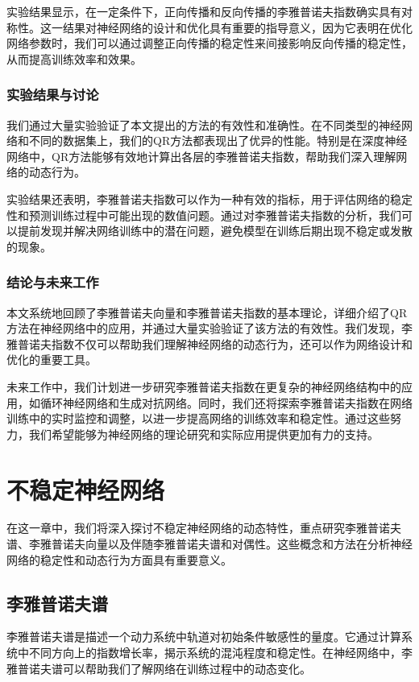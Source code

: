 \documentclass[12pt,a4paper]{amsart}
\begin{document}
实验结果显示，在一定条件下，正向传播和反向传播的李雅普诺夫指数确实具有对称性。这一结果对神经网络的设计和优化具有重要的指导意义，因为它表明在优化网络参数时，我们可以通过调整正向传播的稳定性来间接影响反向传播的稳定性，从而提高训练效率和效果。

\subsubsection{实验结果与讨论}

我们通过大量实验验证了本文提出的方法的有效性和准确性。在不同类型的神经网络和不同的数据集上，我们的QR方法都表现出了优异的性能。特别是在深度神经网络中，QR方法能够有效地计算出各层的李雅普诺夫指数，帮助我们深入理解网络的动态行为。

实验结果还表明，李雅普诺夫指数可以作为一种有效的指标，用于评估网络的稳定性和预测训练过程中可能出现的数值问题。通过对李雅普诺夫指数的分析，我们可以提前发现并解决网络训练中的潜在问题，避免模型在训练后期出现不稳定或发散的现象。

\subsubsection{结论与未来工作}

本文系统地回顾了李雅普诺夫向量和李雅普诺夫指数的基本理论，详细介绍了QR方法在神经网络中的应用，并通过大量实验验证了该方法的有效性。我们发现，李雅普诺夫指数不仅可以帮助我们理解神经网络的动态行为，还可以作为网络设计和优化的重要工具。

未来工作中，我们计划进一步研究李雅普诺夫指数在更复杂的神经网络结构中的应用，如循环神经网络和生成对抗网络。同时，我们还将探索李雅普诺夫指数在网络训练中的实时监控和调整，以进一步提高网络的训练效率和稳定性。通过这些努力，我们希望能够为神经网络的理论研究和实际应用提供更加有力的支持。

\section{不稳定神经网络}

在这一章中，我们将深入探讨不稳定神经网络的动态特性，重点研究李雅普诺夫谱、李雅普诺夫向量以及伴随李雅普诺夫谱和对偶性。这些概念和方法在分析神经网络的稳定性和动态行为方面具有重要意义。

\subsection{李雅普诺夫谱}

李雅普诺夫谱是描述一个动力系统中轨道对初始条件敏感性的量度。它通过计算系统中不同方向上的指数增长率，揭示系统的混沌程度和稳定性。在神经网络中，李雅普诺夫谱可以帮助我们了解网络在训练过程中的动态变化。
\end{document}
